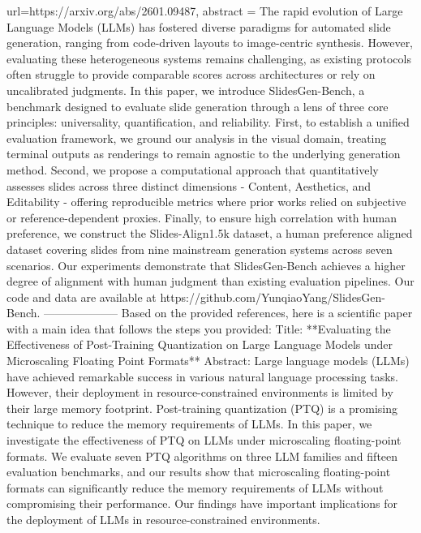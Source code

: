 {      url={https://arxiv.org/abs/2601.09487},
      abstract = {The rapid evolution of Large Language Models (LLMs) has fostered diverse paradigms for automated slide generation, ranging from code-driven layouts to image-centric synthesis. However, evaluating these heterogeneous systems remains challenging, as existing protocols often struggle to provide comparable scores across architectures or rely on uncalibrated judgments. In this paper, we introduce SlidesGen-Bench, a benchmark designed to evaluate slide generation through a lens of three core principles: universality, quantification, and reliability. First, to establish a unified evaluation framework, we ground our analysis in the visual domain, treating terminal outputs as renderings to remain agnostic to the underlying generation method. Second, we propose a computational approach that quantitatively assesses slides across three distinct dimensions - Content, Aesthetics, and Editability - offering reproducible metrics where prior works relied on subjective or reference-dependent proxies. Finally, to ensure high correlation with human preference, we construct the Slides-Align1.5k dataset, a human preference aligned dataset covering slides from nine mainstream generation systems across seven scenarios. Our experiments demonstrate that SlidesGen-Bench achieves a higher degree of alignment with human judgment than existing evaluation pipelines. Our code and data are available at https://github.com/YunqiaoYang/SlidesGen-Bench.}
}
        --------------------
         Based on the provided references, here is a scientific paper with a main idea that follows the steps you provided:
Title: **Evaluating the Effectiveness of Post-Training Quantization on Large Language Models under Microscaling Floating Point Formats**
Abstract:
Large language models (LLMs) have achieved remarkable success in various natural language processing tasks. However, their deployment in resource-constrained environments is limited by their large memory footprint. Post-training quantization (PTQ) is a promising technique to reduce the memory requirements of LLMs. In this paper, we investigate the effectiveness of PTQ on LLMs under microscaling floating-point formats. We evaluate seven PTQ algorithms on three LLM families and fifteen evaluation benchmarks, and our results show that microscaling floating-point formats can significantly reduce the memory requirements of LLMs without compromising their performance. Our findings have important implications for the deployment of LLMs in resource-constrained environments.

